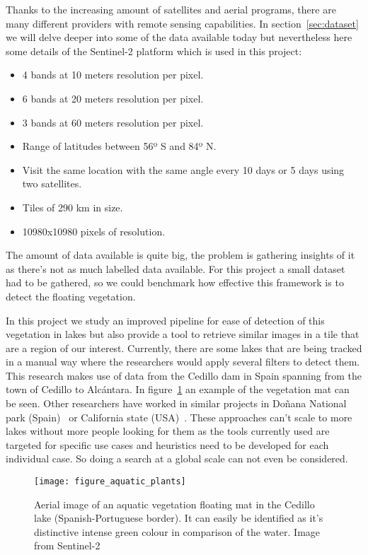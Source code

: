 \documentclass[conference]{IEEEtran}
\begin{document}
    Thanks to the increasing amount of satellites and aerial programs, there are many different providers with remote sensing capabilities.
    In section~\ref{sec:dataset} we will delve deeper into some of the data available today but nevertheless here some details of the Sentinel-2 platform
    which is used in this project:
    \begin{itemize}
        \item 4 bands at 10 meters resolution per pixel.
        \item 6 bands at 20 meters resolution per pixel.
        \item 3 bands at 60 meters resolution per pixel.
        \item Range of latitudes between 56º S and 84º N.
        \item Visit the same location with the same angle every 10 days or 5 days using two satellites.
        \item Tiles of 290 km in size.
        \item 10980x10980 pixels of resolution.
    \end{itemize}
    The amount of data available is quite big, the problem is gathering insights of it as there's not as much labelled data
    available.
    For this project a small dataset had to be gathered, so we could benchmark how effective this framework is to detect the
    floating vegetation.

    In this project we study an improved pipeline for ease of detection of this vegetation in lakes but also provide a tool
    to retrieve similar images in a tile that are a region of our interest.
    Currently, there are some lakes that are being tracked in a manual way where the researchers would apply several filters to detect them.
    This research makes use of data from the Cedillo dam in Spain spanning from the town of Cedillo to Alcántara.
    In figure~\ref{fig:satellite-image-airbus} an example of the vegetation mat can be seen.
    Other researchers have worked in similar projects in Doñana National park (Spain)~\cite{donyana1, donyana2} or California state (USA)~\cite{rs14133013}.
    These approaches can't scale to more lakes without more people looking for them as the tools currently used are targeted
    for specific use cases and heuristics need to be developed for each individual case.
    So doing a search at a global scale can not even be considered.

    \begin{figure}[h]
        \centering
        \texttt{[image: figure\_aquatic\_plants]}
        \caption{Aerial image of an aquatic vegetation floating mat in the Cedillo lake (Spanish-Portuguese border). It can easily be identified as it's distinctive
        intense green colour in comparison of the water. Image from Sentinel-2}
        \label{fig:satellite-image-airbus}
    \end{figure}
\end{document}
